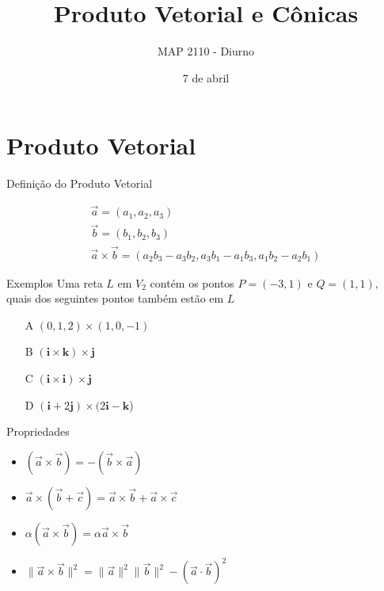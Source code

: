 \documentclass{beamer}
\title[Retas e Planos]{Produto Vetorial e Cônicas}
\author{MAP 2110 - Diurno}
\institute{IME USP}
\date{7 de abril}
\begin{document}
\begin{frame}
  \titlepage
\end{frame}


\section {Produto Vetorial}

\begin{frame}{Definição do Produto Vetorial }
 
 \begin{gather*}
   \vec{a}=(a_1,a_2,a_3)\\
   \vec{b}=(b_1,b_2,b_3)\\
   \vec{a}\times \vec{b}=(a_2b_3-a_3b_2, a_3b_1-a_1b_3, a_1b_2-a_2b_1)
 \end{gather*}

\end{frame}

\begin{frame}{Exemplos}
Uma reta $L$ em $V_2$ contém os pontos $P=(-3,1)$ e $Q=(1,1),$ quais dos seguintes pontos também estão em $L$
\begin{itemize}
   \item[A]$(0, 1, 2) \times (1,0,-1)$
   \item[B]$ (\mathbf{i}\times\mathbf{k})\times\mathbf{j}$
   \item[C]$ (\mathbf{i}\times\mathbf{i})\times\mathbf{j}$
   \item[D]$ (\mathbf{i} + 2\mathbf{j}) \times (2\mathbf{i} - \mathbf{k}$)
\end{itemize}
\end{frame}
\begin{frame}
  

\end{frame}

\begin{frame}{Propriedades}
  \begin{itemize}
    \item $(\vec{a}\times \vec{b}) = - (\vec{b}\times \vec{a})$
    \item $\vec{a}\times(\vec{b} + \vec{c})=\vec{a}\times \vec{b} + \vec{a}\times\vec{c}$
    \item $\alpha(\vec{a}\times \vec{b})=\alpha\vec{a}\times \vec{b}$
    \item $\|\vec{a}\times\vec{b}\|^2 =\|\vec{a}\|^2 \|\vec{b}\|^2 -(\vec{a}\cdot\vec{b})^2$  \end{itemize}

\end{frame}
\begin{frame}
  
\end{frame}
\end{document}
